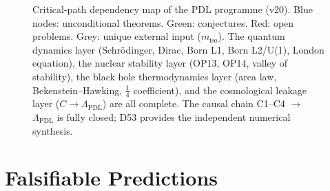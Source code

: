 \documentclass[11pt,a4paper]{article}
\theoremstyle{plain}
\theoremstyle{definition}
\theoremstyle{remark}
\begin{document}
\begin{figure}[H]
{%
}
\caption{Critical-path dependency map of the PDL programme (v20). \textcolor{proofblue}{Blue nodes}: unconditional theorems. \textcolor{conjecturegreen}{Green}: conjectures. \textcolor{openproblemred}{Red}: open problems. Grey: unique external input ($m_{\mathrm{iso}}$). The quantum dynamics layer (Schr\"odinger, Dirac, Born L1, Born L2/U(1), London equation), the nuclear stability layer (OP13, OP14, valley of stability), the black hole thermodynamics layer (area law, Bekenstein--Hawking, $\tfrac{1}{4}$ coefficient), and the cosmological leakage layer ($C \to \Lambda_{\mathrm{PDL}}$) are all complete. The causal chain C1--C4 $\to$ $\Lambda_{\mathrm{PDL}}$ is fully closed; D53 provides the independent numerical synthesis.}
\label{fig:dependency}
\end{figure}

\newpage

\section{Falsifiable Predictions}
\label{sec:predictions}
\end{document}
